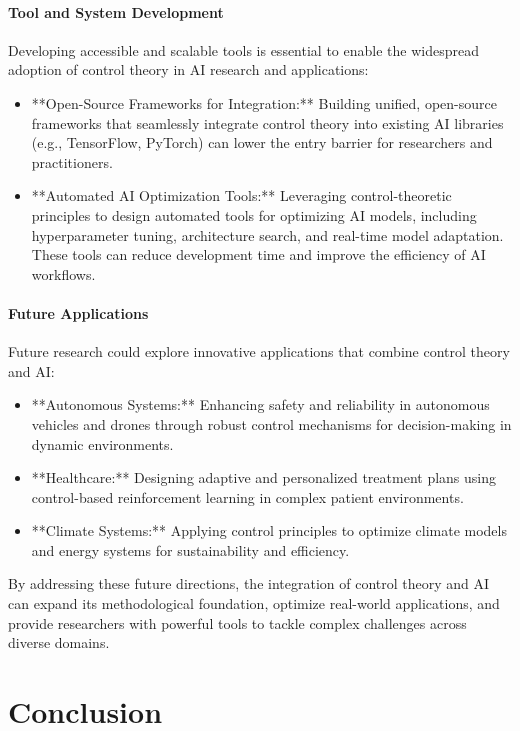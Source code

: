 \documentclass{IEEEojcsys}
\begin{document}
\paragraph{Tool and System Development}
Developing accessible and scalable tools is essential to enable the widespread adoption of control theory in AI research and applications:
\begin{itemize}
    \item **Open-Source Frameworks for Integration:** Building unified, open-source frameworks that seamlessly integrate control theory into existing AI libraries (e.g., TensorFlow, PyTorch) can lower the entry barrier for researchers and practitioners.
    \item **Automated AI Optimization Tools:** Leveraging control-theoretic principles to design automated tools for optimizing AI models, including hyperparameter tuning, architecture search, and real-time model adaptation. These tools can reduce development time and improve the efficiency of AI workflows.
\end{itemize}

\paragraph{Future Applications}
Future research could explore innovative applications that combine control theory and AI:
\begin{itemize}
    \item **Autonomous Systems:** Enhancing safety and reliability in autonomous vehicles and drones through robust control mechanisms for decision-making in dynamic environments.
    \item **Healthcare:** Designing adaptive and personalized treatment plans using control-based reinforcement learning in complex patient environments.
    \item **Climate Systems:** Applying control principles to optimize climate models and energy systems for sustainability and efficiency.
\end{itemize}

By addressing these future directions, the integration of control theory and AI can expand its methodological foundation, optimize real-world applications, and provide researchers with powerful tools to tackle complex challenges across diverse domains.

\section{Conclusion}
\end{document}
